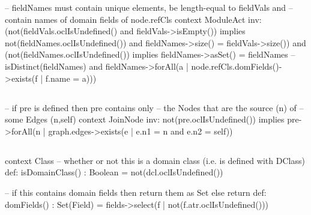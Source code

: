 \begin{lstrule}
-- fieldNames must contain unique elements, be length-equal to fieldVals and 
-- contain names of domain fields of node.refCls
context ModuleAct inv:
  (not(fieldVals.oclIsUndefined() and fieldVals->isEmpty()) implies 
    not(fieldNames.oclIsUndefined()) and fieldNames->size() = fieldVals->size()) and 
  (not(fieldNames.oclIsUndefined()) implies 
    fieldNames->asSet() = fieldNames  -- isDistinct(fieldNames) and 
    fieldNames->forAll(a | node.refCls.domFields()->exists(f | f.name = a)))
\end{lstrule}

%
\subsection{}
\begin{lstrule}
-- if pre is defined then pre contains only 
-- the Nodes that are the source (n) of 
-- some Edges (n,self)
context JoinNode inv:
  not(pre.oclIsUndefined()) implies 
  pre->forAll(n | graph.edges->exists(e | 
    e.n1 = n and e.n2 = self))
\end{lstrule}

%
\subsection{} \label{apex:agl-Class}
\begin{lstrule}
context Class
  -- whether or not this is a domain class (i.e. is defined with DClass)
  def: isDomainClass() : Boolean = 
    not(dcl.oclIsUndefined())
  
  -- if this contains domain fields then return them as Set else return {} 
  def: domFields() : Set(Field) = 
  fields->select(f | not(f.atr.oclIsUndefined())) 
\end{lstrule}

%
%
